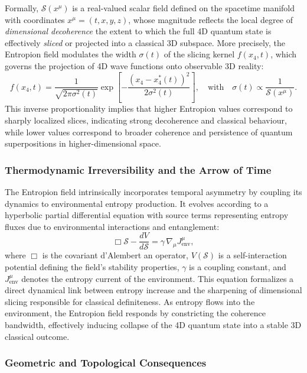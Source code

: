 \documentclass[12pt]{article}
\begin{document}
Formally, $\mathcal{S}(x^\mu)$ is a real-valued scalar field defined on the spacetime manifold with coordinates $x^\mu = (t, x, y, z)$, whose magnitude reflects the local degree of \textit{dimensional decoherence}   the extent to which the full 4D quantum state is effectively \textit{sliced} or projected into a classical 3D subspace. More precisely, the Entropion field modulates the width $\sigma(t)$ of the slicing kernel $f(x_4, t)$, which governs the projection of 4D wave functions onto observable 3D reality:
\begin{equation}
f(x_4, t) = \frac{1}{\sqrt{2\pi \sigma^2(t)}} \exp\left[-\frac{(x_4 - x_4^*(t))^2}{2\sigma^2(t)}\right], \quad \text{with} \quad \sigma(t) \propto \frac{1}{\mathcal{S}(x^\mu)}.
\end{equation}
This inverse proportionality implies that higher Entropion values correspond to sharply localized slices, indicating strong decoherence and classical behaviour, while lower values correspond to broader coherence and persistence of quantum superpositions in higher-dimensional space.

\subsubsection*{Thermodynamic Irreversibility and the Arrow of Time}

The Entropion field intrinsically incorporates temporal asymmetry by coupling its dynamics to environmental entropy production. It evolves according to a hyperbolic partial differential equation with source terms representing entropy fluxes due to environmental interactions and entanglement:
\begin{equation}
\Box \mathcal{S} - \frac{dV}{d\mathcal{S}} = \gamma \, \nabla_\mu J^\mu_\mathrm{env},
\end{equation}
where $\Box$ is the covariant d’Alembert an operator, $V(\mathcal{S})$ is a self-interaction potential defining the field’s stability properties, $\gamma$ is a coupling constant, and $J^\mu_\mathrm{env}$ denotes the entropy current of the environment. This equation formalizes a direct dynamical link between entropy increase and the sharpening of dimensional slicing responsible for classical definiteness. As entropy flows into the environment, the Entropion field responds by constricting the coherence bandwidth, effectively inducing collapse of the 4D quantum state into a stable 3D classical outcome.

\subsubsection*{Geometric and Topological Consequences}
\end{document}

